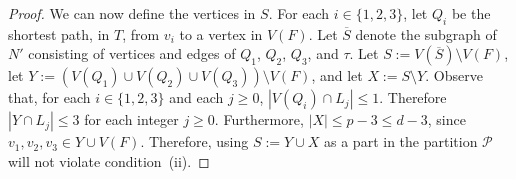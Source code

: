 \documentclass{patmorin}
\theoremstyle{plain}
\theoremstyle{definition}
\DeclareMathOperator{\dist}{dist}
\newcommand{\PP}{\mathcal{P}}
\renewcommand{\ge}{\geqslant}
\renewcommand{\le}{\leqslant}
\begin{document}
\begin{proof}

	We can now define the vertices in $S$.  For each $i\in\{1,2,3\}$, let $Q_i$ be the shortest path, in $T$, from $v_i$ to a vertex in $V(F)$.  Let $\overline{S}$ denote the subgraph of $N'$ consisting of vertices and edges of $Q_1$, $Q_2$, $Q_3$, and $\tau$.  Let $S:=V(\overline{S})\setminus V(F)$, let $Y:=(V(Q_1)\cup V(Q_2)\cup V(Q_3))\setminus V(F)$, and let $X:=S\setminus Y$.
	Observe that, for each $i\in\{1,2,3\}$ and each $j\ge 0$, $|V(Q_i)\cap L_j|\le 1$.  Therefore $|Y\cap L_j|\le 3$ for each integer $j\ge 0$. Furthermore, $|X|\le p-3\le d-3$, since $v_1,v_2,v_3\in Y\cup V(F)$. Therefore, using $S:=Y\cup X$ as a part in the partition $\PP$ will not violate condition~(ii).




\end{proof}
\end{document}
